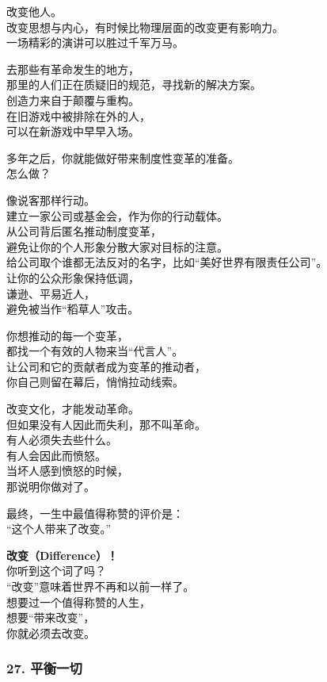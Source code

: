 \documentclass[
]{article}
\begin{document}
改变他人。\\
改变思想与内心，有时候比物理层面的改变更有影响力。\\
一场精彩的演讲可以胜过千军万马。

去那些有革命发生的地方，\\
那里的人们正在质疑旧的规范，寻找新的解决方案。\\
创造力来自于颠覆与重构。\\
在旧游戏中被排除在外的人，\\
可以在新游戏中早早入场。

多年之后，你就能做好带来制度性变革的准备。\\
怎么做？

像说客那样行动。\\
建立一家公司或基金会，作为你的行动载体。\\
从公司背后匿名推动制度变革，\\
避免让你的个人形象分散大家对目标的注意。\\
给公司取个谁都无法反对的名字，比如``美好世界有限责任公司''。\\
让你的公众形象保持低调，\\
谦逊、平易近人，\\
避免被当作``稻草人''攻击。

你想推动的每一个变革，\\
都找一个有效的人物来当``代言人''。\\
让公司和它的贡献者成为变革的推动者，\\
你自己则留在幕后，悄悄拉动线索。

改变文化，才能发动革命。\\
但如果没有人因此而失利，那不叫革命。\\
有人必须失去些什么。\\
有人会因此而愤怒。\\
当坏人感到愤怒的时候，\\
那说明你做对了。

最终，一生中最值得称赞的评价是：\\
``这个人带来了改变。''

\textbf{改变（Difference）！}\\
你听到这个词了吗？\\
``改变''意味着世界不再和以前一样了。\\
想要过一个值得称赞的人生，\\
想要``带来改变''，\\
你就必须去改变。

\subsubsection{\texorpdfstring{27. 平衡一切
}{27. 平衡一切 }}\label{27-ux5e73ux8861ux4e00ux5207}
\end{document}
